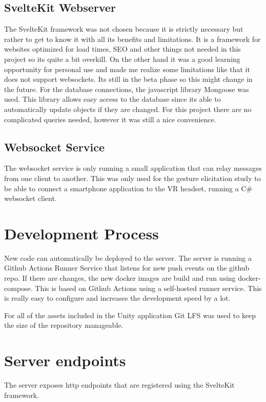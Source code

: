 \subsection{SvelteKit Webserver}
The SvelteKit framework was not chosen because it is strictly necessary but rather to get to know it with all its benefits and limitations. It is a framework for websites optimized for load times, SEO and other things not needed in this project so its quite a bit overkill. On the other hand it was a good learning opportunity for personal use and made me realize some limitations like that it does not support websockets. Its still in the beta phase so this might change in the future. For the database connections, the javascript library Mongoose was used. This library allows easy access to the database since its able to automatically update objects if they are changed. For this project there are no complicated queries needed, however it was still a nice convenience. 

\subsection{Websocket Service}
The websocket service is only running a small application that can relay messages from one client to another. This was only used for the gesture elicitation study to be able to connect a smartphone application to the VR headset, running a C# websocket client.


\section{Development Process}
New code can automatically be deployed to the server. The server is running a Github Actions Runner Service that listens for new push events on the github repo. If there are changes, the new docker images are build and run using docker-compose. This is based on Github Actions using a self-hosted runner service. This is really easy to configure and increases the development speed by a lot. 

For all of the assets included in the Unity application Git LFS was used to keep the size of the repository manageable.


\section{Server endpoints}
The server exposes http endpoints that are registered using the SvelteKit framework.

